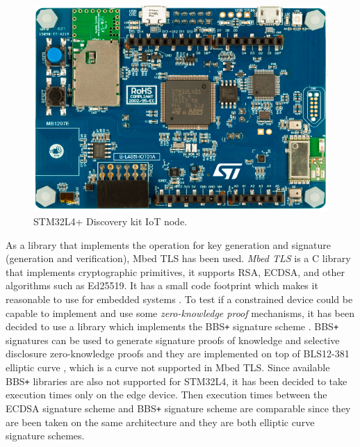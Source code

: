 \begin{figure}[h!]
    \centering
    \includegraphics[scale=0.30]{./chapters/images/STM32L4+ Discovery kit IoT node.jpeg}
    \caption{STM32L4+ Discovery kit IoT node\cite{stm32-board-product}.}
    \label{stm-board}
\end{figure}

As a library that implements the operation for key generation and signature (generation and verification), Mbed TLS has been used. \textit{Mbed TLS} is a C library that implements cryptographic primitives, it supports RSA, ECDSA, and other algorithms such as Ed25519. It has a small code footprint which makes it reasonable to use for embedded systems \cite{mbed-tls}. To test if a constrained device could be capable to implement and use some \textit{zero-knowledge proof} mechanisms, it has been decided to use a library which implements the BBS\texttt{+} signature scheme \cite{bbsplus}. BBS\texttt{+} signatures can be used to generate signature proofs of knowledge and selective disclosure zero-knowledge proofs \cite{bbs-rust} and they are implemented on top of BLS12-381 elliptic curve \cite{bls-curve}, which is a curve not supported in Mbed TLS. Since available BBS\texttt{+} libraries are also not supported for STM32L4, it has been decided to take execution times only on the edge device. Then execution times between the ECDSA signature scheme and BBS\texttt{+} signature scheme are comparable since they are been taken on the same architecture and they are both elliptic curve signature schemes.

